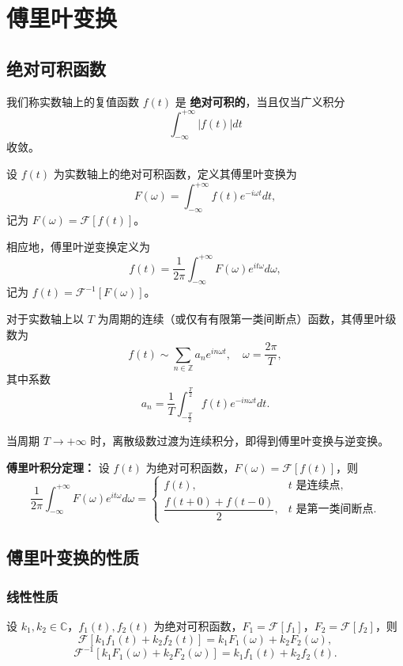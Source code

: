 \chapter{傅里叶变换}

\section{绝对可积函数}
我们称实数轴上的复值函数 \( f(t) \) 是 \textbf{绝对可积的}，当且仅当广义积分
\[
\int_{-\infty}^{+\infty} |f(t)| dt
\]
收敛。

设 \( f(t) \) 为实数轴上的绝对可积函数，定义其傅里叶变换为
\[
F(\omega)=\int_{-\infty}^{+\infty} f(t) e^{-i \omega t} d t,
\]
记为 \( F(\omega)=\mathscr{F}[f(t)] \)。

相应地，傅里叶逆变换定义为
\[
f(t)=\frac{1}{2 \pi} \int_{-\infty}^{+\infty} F(\omega) e^{i t \omega} d \omega,
\]
记为 \( f(t)=\mathscr{F}^{-1}[F(\omega)] \)。

对于实数轴上以 \( T \) 为周期的连续（或仅有有限第一类间断点）函数，其傅里叶级数为
\[
f(t) \sim \sum_{n \in \mathbb{Z}} a_{n} e^{i n \omega t}, \quad \omega=\frac{2 \pi}{T},
\]
其中系数
\[
a_{n}=\frac{1}{T} \int_{-\frac{T}{2}}^{\frac{T}{2}} f(t) e^{-i n \omega t} d t.
\]

当周期 \( T\to+\infty \) 时，离散级数过渡为连续积分，即得到傅里叶变换与逆变换。

\textbf{傅里叶积分定理：}
设 \( f(t) \) 为绝对可积函数，\( F(\omega)=\mathscr{F}[f(t)] \)，则
\[
\frac{1}{2\pi}\int_{-\infty}^{+\infty}F(\omega)e^{it\omega}d\omega
=
\begin{cases}
f(t), & t\text{ 是连续点}, \\
\dfrac{f(t+0)+f(t-0)}{2}, & t\text{ 是第一类间断点}.
\end{cases}
\]

\section{傅里叶变换的性质}

\subsection{线性性质}
设 \( k_1,k_2\in\mathbb{C} \)，\( f_1(t),f_2(t) \) 为绝对可积函数，\( F_1=\mathscr{F}[f_1] \)，\( F_2=\mathscr{F}[f_2] \)，则
\[
\mathscr{F}\left[k_1 f_1(t)+k_2 f_2(t)\right]
=
k_1 F_1(\omega)+k_2 F_2(\omega),
\]
\[
\mathscr{F}^{-1}\left[k_1 F_1(\omega)+k_2 F_2(\omega)\right]
=
k_1 f_1(t)+k_2 f_2(t).
\]

